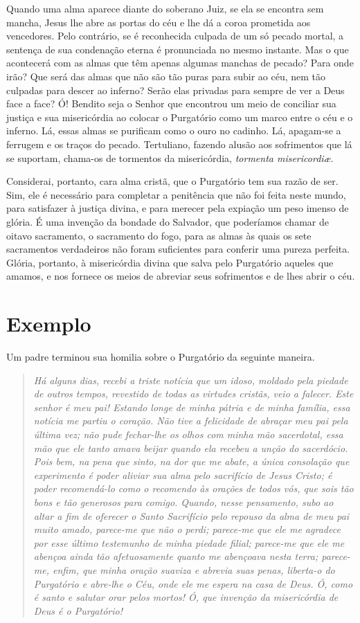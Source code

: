 Quando uma alma aparece diante do soberano Juiz, se ela se encontra sem mancha, Jesus lhe abre as portas do céu e lhe dá
a coroa prometida aos vencedores. Pelo contrário, se é reconhecida culpada de um só pecado mortal, a sentença de sua condenação eterna é pronunciada no mesmo instante. Mas o que acontecerá com as almas que têm apenas algumas manchas de pecado? Para onde irão? Que será das almas que não são tão puras para subir ao céu, nem tão culpadas para descer ao inferno? Serão elas privadas para sempre de ver a Deus face a face? Ó! Bendito seja o Senhor que encontrou um meio de
conciliar sua justiça e sua misericórdia ao colocar o Purgatório como um marco entre o céu e o inferno. Lá, essas almas se purificam como o ouro no cadinho. Lá, apagam-se a ferrugem e os traços do pecado. Tertuliano, fazendo alusão aos sofrimentos que lá se suportam, chama-os de tormentos da misericórdia, \textit{tormenta misericordiæ}.

Considerai, portanto, cara alma cristã, que o Purgatório tem sua razão de ser. Sim, ele é necessário para completar a penitência que não foi feita neste mundo, para satisfazer à justiça divina, e para merecer pela expiação um peso imenso de glória. É uma invenção da bondade do Salvador, que poderíamos chamar de oitavo sacramento, o sacramento do fogo, para as almas às quais os sete sacramentos verdadeiros não foram suficientes para conferir uma pureza perfeita. Glória, portanto, à misericórdia divina que salva pelo Purgatório aqueles que amamos, e nos fornece os meios de abreviar seus sofrimentos e de lhes abrir o céu.


\section*{Exemplo}

Um padre terminou sua homilia sobre o Purgatório da seguinte maneira.

\begin{quote}
\textit{\textit{Há alguns dias, recebi a triste notícia que um idoso, moldado pela piedade de outros tempos, revestido de todas as virtudes cristãs, veio a falecer. Este senhor é meu pai! Estando longe de minha pátria e de minha família, essa notícia me partiu o coração. Não tive a felicidade de abraçar meu pai pela última vez; não pude fechar-lhe os olhos com minha mão sacerdotal, essa mão que ele tanto amava beijar quando ela recebeu a unção do sacerdócio. Pois bem, na pena que sinto, na dor que me abate, a única consolação que experimento é poder aliviar sua alma pelo sacrifício de Jesus Cristo; é poder recomendá-lo como o recomendo às orações de todos vós, que sois tão bons e tão generosos para comigo. Quando, nesse pensamento, subo ao altar a fim de oferecer o Santo Sacrifício pelo repouso da alma de meu pai muito amado, parece-me que não o perdi; parece-me que ele me agradece por esse último testemunho de minha piedade filial; parece-me que ele me abençoa ainda tão afetuosamente quanto me abençoava nesta terra; parece-me, enfim, que minha oração suaviza e abrevia suas penas, liberta-o do Purgatório e abre-lhe o Céu, onde ele me espera na casa de Deus. Ó, como é santo e salutar orar pelos mortos! Ó, que invenção da misericórdia de Deus é o Purgatório!}}
\end{quote}

